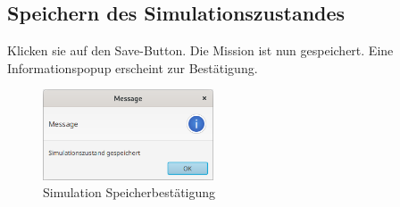 \subsection{Speichern des Simulationszustandes}
Klicken sie auf den Save-Button. 
Die Mission ist nun gespeichert. 
Eine Informationspopup erscheint zur Bestätigung.

\begin{figure}[H]
	\centering
	\includegraphics[width=0.45\textwidth]{res/simsaved.png}
	\caption{Simulation Speicherbestätigung}
\end{figure}
 